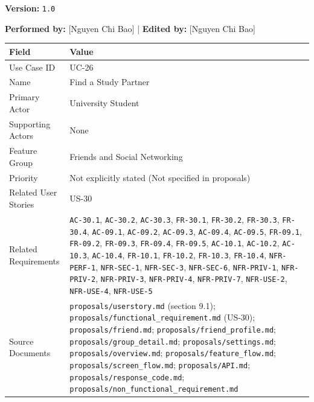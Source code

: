\documentclass[12pt]{article}
\renewcommand{\baselinestretch}{1.5}
\begin{document}
\textbf{Version:} \texttt{1.0}
\par\medskip

\textbf{Performed by:} [Nguyen Chi Bao] | \textbf{Edited by:} [Nguyen Chi Bao]
\par\medskip

\begingroup
\small
\renewcommand{\baselinestretch}{1.0}\selectfont
\renewcommand{\arraystretch}{1.15}
\setlength{\tabcolsep}{6pt}
\begin{longtable}{|>{\raggedright\arraybackslash}p{}|>{\raggedright\arraybackslash}p{}|}
\hline
\textbf{Field} & \textbf{Value} \\ \hline
\endhead
Use Case ID & UC-26 \\ \hline
Name & Find a Study Partner \\ \hline
Primary Actor & University Student \\ \hline
Supporting Actors & None \\ \hline
Feature Group & Friends and Social Networking \\ \hline
Priority & Not explicitly stated (Not specified in proposals) \\ \hline
Related User Stories & US-30 \\ \hline
Related Requirements & \texttt{AC-30.1}, \texttt{AC-30.2}, \texttt{AC-30.3}, \texttt{FR-30.1}, \texttt{FR-30.2}, \texttt{FR-30.3}, \texttt{FR-30.4}, \texttt{AC-09.1}, \texttt{AC-09.2}, \texttt{AC-09.3}, \texttt{AC-09.4}, \texttt{AC-09.5}, \texttt{FR-09.1}, \texttt{FR-09.2}, \texttt{FR-09.3}, \texttt{FR-09.4}, \texttt{FR-09.5}, \texttt{AC-10.1}, \texttt{AC-10.2}, \texttt{AC-10.3}, \texttt{AC-10.4}, \texttt{FR-10.1}, \texttt{FR-10.2}, \texttt{FR-10.3}, \texttt{FR-10.4}, \texttt{NFR-PERF-1}, \texttt{NFR-SEC-1}, \texttt{NFR-SEC-3}, \texttt{NFR-SEC-6}, \texttt{NFR-PRIV-1}, \texttt{NFR-PRIV-2}, \texttt{NFR-PRIV-3}, \texttt{NFR-PRIV-4}, \texttt{NFR-PRIV-7}, \texttt{NFR-USE-2}, \texttt{NFR-USE-4}, \texttt{NFR-USE-5} \\ \hline
Source Documents & \texttt{proposals/userstory.md} (section 9.1); \texttt{proposals/functional\_requirement.md} (US-30); \texttt{proposals/friend.md}; \texttt{proposals/friend\_profile.md}; \texttt{proposals/group\_detail.md}; \texttt{proposals/settings.md}; \texttt{proposals/overview.md}; \texttt{proposals/feature\_flow.md}; \texttt{proposals/screen\_flow.md}; \texttt{proposals/API.md}; \texttt{proposals/response\_code.md}; \texttt{proposals/non\_functional\_requirement.md} \\ \hline
\end{longtable}
\endgroup
\par\medskip
\end{document}
